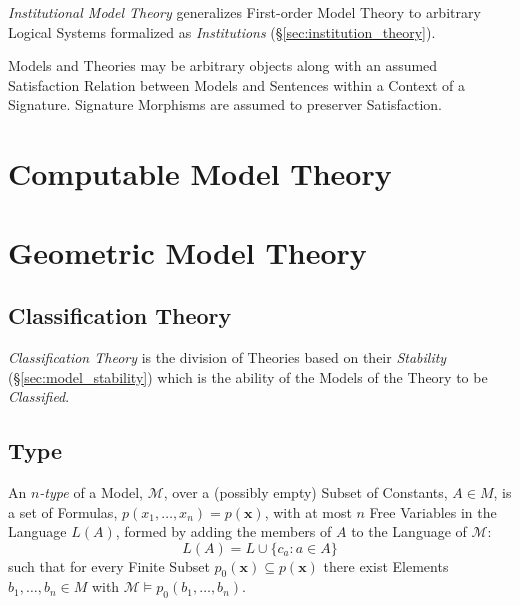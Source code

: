 \emph{Institutional Model Theory} generalizes First-order Model Theory
to arbitrary Logical Systems formalized as \emph{Institutions}
(\S\ref{sec:institution_theory}).

Models and Theories may be arbitrary objects along with an assumed
Satisfaction Relation between Models and Sentences within a Context of
a Signature. Signature Morphisms are assumed to preserver
Satisfaction.



\section{Computable Model Theory}\label{sec:computable_model}
\cite{harizanov98}




\section{Geometric Model Theory}\label{sec:geometric_model}

\subsection{Classification Theory}\label{sec:classification_theory}

\emph{Classification Theory} is the division of Theories based on
their \emph{Stability} (\S\ref{sec:model_stability}) which is the
ability of the Models of the Theory to be \emph{Classified}.



\subsection{Type}\label{sec:model_type}

An \emph{$n$-type} of a Model, $\mathcal{M}$, over a (possibly empty)
Subset of Constants, $A \in M$, is a set of Formulas,
$p(x_1,\ldots,x_n) = p(\mathbf{x})$, with at most $n$ Free Variables
in the Language $L(A)$, formed by adding the members of $A$ to the
Language of $\mathcal{M}$:
\[
  L(A) = L \cup \{ c_a : a \in A \}
\]
such that for every Finite Subset $p_0(\mathbf{x}) \subseteq
p(\mathbf{x})$ there exist Elements $b_1,\ldots,b_n \in M$ with
$\mathcal{M} \models p_0(b_1,\ldots,b_n)$.

